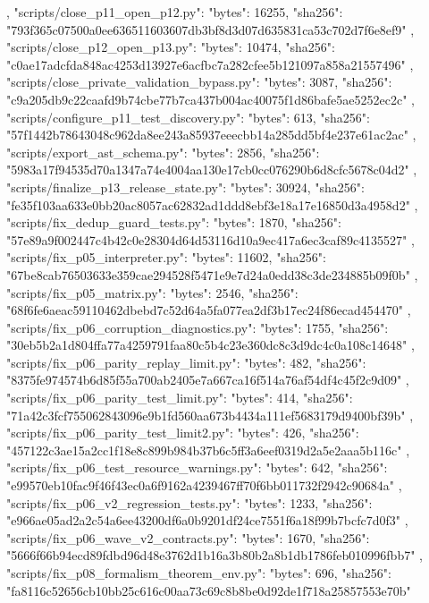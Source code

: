 {{{    },
    "scripts/close_p11_open_p12.py": {
      "bytes": 16255,
      "sha256": "793f365c07500a0ee636511603607db3bf8d3d07d635831ca53c702d7f6e8ef9"
    },
    "scripts/close_p12_open_p13.py": {
      "bytes": 10474,
      "sha256": "c0ae17adcfda848ac4253d13927e6acfbc7a282cfee5b121097a858a21557496"
    },
    "scripts/close_private_validation_bypass.py": {
      "bytes": 3087,
      "sha256": "c9a205db9c22caafd9b74cbe77b7ca437b004ac40075f1d86bafe5ae5252ec2c"
    },
    "scripts/configure_p11_test_discovery.py": {
      "bytes": 613,
      "sha256": "57f1442b78643048c962da8ee243a85937eeecbb14a285dd5bf4e237e61ac2ac"
    },
    "scripts/export_ast_schema.py": {
      "bytes": 2856,
      "sha256": "5983a17f94535d70a1347a74e4004aa130e17cb0cc076290b6d8cfc5678c04d2"
    },
    "scripts/finalize_p13_release_state.py": {
      "bytes": 30924,
      "sha256": "fe35f103aa633e0bb20ac8057ac62832ad1ddd8ebf3e18a17e16850d3a4958d2"
    },
    "scripts/fix_dedup_guard_tests.py": {
      "bytes": 1870,
      "sha256": "57e89a9f002447c4b42c0e28304d64d53116d10a9ec417a6ec3caf89c4135527"
    },
    "scripts/fix_p05_interpreter.py": {
      "bytes": 11602,
      "sha256": "67be8cab76503633e359cae294528f5471e9e7d24a0edd38c3de234885b09f0b"
    },
    "scripts/fix_p05_matrix.py": {
      "bytes": 2546,
      "sha256": "68f6fe6aeac59110462dbebd7c52d64a5fa077ea2df3b17ec24f86ecad454470"
    },
    "scripts/fix_p06_corruption_diagnostics.py": {
      "bytes": 1755,
      "sha256": "30eb5b2a1d804ffa77a4259791faa80c5b4c23e360dc8c3d9dc4c0a108c14648"
    },
    "scripts/fix_p06_parity_replay_limit.py": {
      "bytes": 482,
      "sha256": "8375fe974574b6d85f55a700ab2405e7a667ca16f514a76af54df4c45f2c9d09"
    },
    "scripts/fix_p06_parity_test_limit.py": {
      "bytes": 414,
      "sha256": "71a42c3fcf755062843096e9b1fd560aa673b4434a111ef5683179d9400bf39b"
    },
    "scripts/fix_p06_parity_test_limit2.py": {
      "bytes": 426,
      "sha256": "457122c3ae15a2cc1f18e8c899b984b37b6c5ff3a6eef0319d2a5e2aaa5b116c"
    },
    "scripts/fix_p06_test_resource_warnings.py": {
      "bytes": 642,
      "sha256": "e99570eb10fac9f46f43ec0a6f9162a4239467ff70f6bb011732f2942c90684a"
    },
    "scripts/fix_p06_v2_regression_tests.py": {
      "bytes": 1233,
      "sha256": "e966ae05ad2a2c54a6ee43200df6a0b9201df24ce7551f6a18f99b7bcfc7d0f3"
    },
    "scripts/fix_p06_wave_v2_contracts.py": {
      "bytes": 1670,
      "sha256": "5666f66b94ecd89fdbd96d48e3762d1b16a3b80b2a8b1db1786feb010996fbb7"
    },
    "scripts/fix_p08_formalism_theorem_env.py": {
      "bytes": 696,
      "sha256": "fa8116c52656cb10bb25c616c00aa73c69c8b8be0d92de1f718a25857553e70b"
}}}
